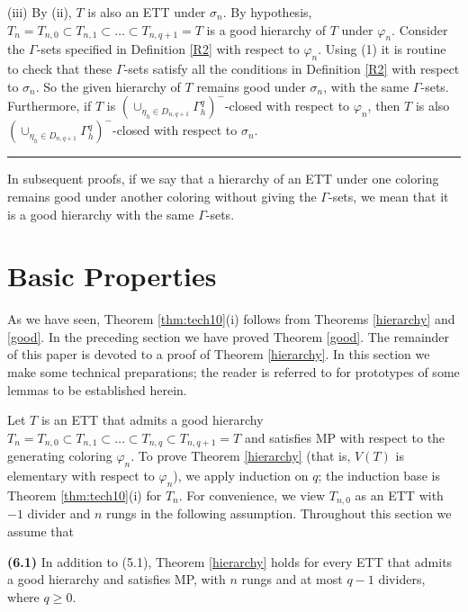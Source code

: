 \documentclass[11pt]{article}
\def\qed{\hfill \rule{4pt}{7pt}}
\begin{document}
(iii) %
By (ii), $T$ is also an ETT under $\sigma_n$. By hypothesis, $T_n=T_{n,0} \subset T_{n,1} \subset \ldots  \subset T_{n,q+1}=T$ is a 
good hierarchy of $T$ under $\varphi_n$. Consider the $\Gamma$-sets specified in Definition \ref{R2} with respect 
to $\varphi_n$.  Using (1) it is routine to check that these $\Gamma$-sets satisfy all the conditions in Definition 
\ref{R2} with respect to $\sigma_n$. So the given hierarchy of $T$ remains good under $\sigma_n$, with the same 
$\Gamma$-sets.  Furthermore, if $T$ is $(\cup_{\eta_h\in D_{n,q+1}}\Gamma^{q}_h)^-$-closed with respect to $\varphi_n$, 
then $T$ is also $(\cup_{\eta_h\in D_{n,q+1}}\Gamma^{q}_h)^-$-closed with respect to $\sigma_n$. \qed

\vskip 2mm

In subsequent proofs, if we say that a hierarchy of an ETT under one coloring remains good under another coloring without giving 
the $\Gamma$-sets, we mean that it is a good hierarchy with the same $\Gamma$-sets.  

\section{Basic Properties}

As we have seen, Theorem \ref{thm:tech10}(i) follows from Theorems \ref{hierarchy} and \ref{good}. 
In the preceding section we have proved Theorem \ref{good}. The remainder of this paper is devoted to a
proof of Theorem \ref{hierarchy}. In this section we make some technical preparations; the reader is referred
to \cite{GG} for prototypes of some lemmas to be established herein. 

Let $T$ is an ETT that admits a good hierarchy $T_n=T_{n,0} \subset T_{n,1} \subset \ldots \subset
T_{n,q} \subset T_{n,q+1}=T$ and satisfies MP with respect to the generating coloring $\varphi_n$. To prove
Theorem \ref{hierarchy} (that is, $V(T)$ is elementary with respect to $\varphi_n$), we apply induction on
$q$; the induction base is Theorem \ref{thm:tech10}(i) for $T_n$. For convenience, we view $T_{n,0}$ as 
an ETT with $-1$ divider and $n$ rungs in the following assumption. Throughout this section we assume that 

{\bf (6.1)} In addition to (5.1), Theorem \ref{hierarchy} holds for every ETT that admits a good hierarchy
and satisfies MP, with $n$ rungs and at most $q-1$ dividers, where $q\ge 0$.  
\end{document}
